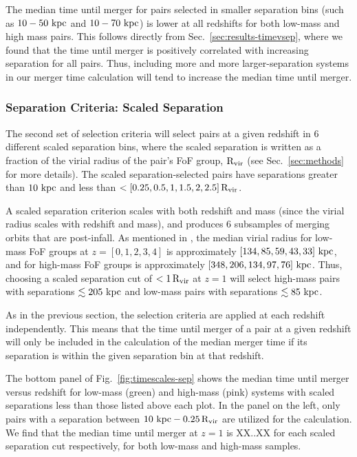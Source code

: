 \documentclass[twocolumn,linenumbers]{aastex631}
\newcommand{\Rvir}{\ensuremath{\rm R_{vir}}}
\newcommand{\chambe}{\citet{Chamberlain2024}}
\begin{document}
The median time until merger for pairs selected in smaller separation bins (such as $10-50\,\mathrm{\,kpc}$ and $10-70\,\mathrm{\,kpc}$) is lower at all redshifts for both low-mass and high mass pairs. 
This follows directly from Sec.~\ref{sec:results-timevsep}, where we found that the time until merger is positively correlated with increasing separation for all pairs. 
Thus, including more and more larger-separation systems in our merger time calculation will tend to increase the median time until merger. 

\subsubsection{Separation Criteria: Scaled Separation}
The second set of selection criteria will select pairs at a given redshift in 6 different scaled separation bins, where the scaled separation is written as a fraction of the virial radius of the pair's FoF group, $\Rvir$ (see Sec.~\ref{sec:methods} for more details). 
The scaled separation-selected pairs have separations greater than $10\,\mathrm{\,kpc}$ and less than $<[0.25, 0.5, 1, 1.5, 2, 2.5]\,\Rvir$. 

A scaled separation criterion scales with both redshift and mass (since the virial radius scales with redshift and mass), and produces 6 subsamples of merging orbits that are post-infall.
As mentioned in \chambe{}, the median virial radius for low-mass FoF groups at $z=[0,1,2,3,4]$ is approximately $[134, 85, 59, 43, 33]\,\mathrm{\,kpc}$, and for high-mass FoF groups is approximately $[348, 206, 134, 97, 76]\,\mathrm{\,kpc}$.
Thus, choosing a scaled separation cut of $<1\,\Rvir$ at $z=1$ will select high-mass pairs with separations $\lesssim205\,\mathrm{\,kpc}$ and low-mass pairs with separations $\lesssim85\,\mathrm{\,kpc}$.

As in the previous section, the selection criteria are applied at each redshift independently. 
This means that the time until merger of a pair at a given redshift will only be included in the calculation of the median merger time if its separation is within the given separation bin at that redshift. 

The bottom panel of Fig.~\ref{fig:timescales-sep} shows the median time until merger versus redshift for low-mass (green) and high-mass (pink) systems with scaled separations less than those listed above each plot. 
In the panel on the left, only pairs with a separation between $10\,\kpc-0.25\,\Rvir$ are utilized for the calculation. 
We find that the median time until merger at $z=1$ is XX..XX for each scaled separation cut respectively, for both low-mass and high-mass samples.
\end{document}
